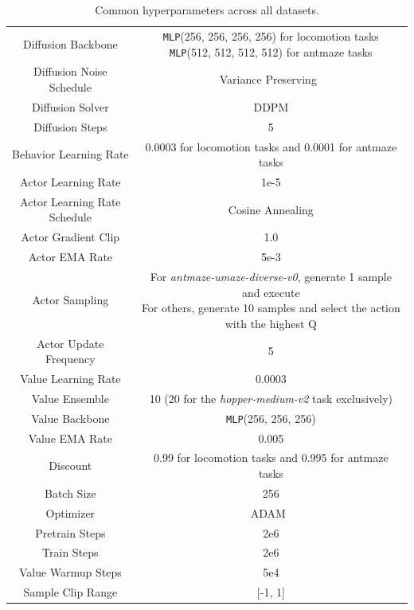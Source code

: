\begin{table}[htbp]
    \centering
    \caption{Common hyperparameters across all datasets.}
    \label{apptab:common_param}
    \begin{tabular}{c|c}
        \toprule
        Diffusion Backbone & \makecell[c]{\texttt{MLP}(256, 256, 256, 256) for locomotion tasks\\\texttt{MLP}(512, 512, 512, 512) for antmaze tasks}\\
        Diffusion Noise Schedule & Variance Preserving~\citep{diffusion_sde}\\
        Diffusion Solver & DDPM \\
        Diffusion Steps & 5\\
        Behavior Learning Rate & 0.0003 for locomotion tasks and 0.0001 for antmaze tasks\\
        Actor Learning Rate & 1e-5\\
        Actor Learning Rate Schedule & Cosine Annealing\\
        Actor Gradient Clip & 1.0\\
        Actor EMA Rate & 5e-3 \\
        Actor Sampling & \makecell[c]{For \textit{antmaze-umaze-diverse-v0}, generate 1 sample and execute\\For others, generate 10 samples and select the action with the highest Q} \\
        Actor Update Frequency & 5\\
        Value Learning Rate & 0.0003 \\
        Value Ensemble & 10  (20 for the \textit{hopper-medium-v2} task exclusively) \\
        Value Backbone & \texttt{MLP}(256, 256, 256)\\
        Value EMA Rate & 0.005 \\
        Discount & 0.99 for locomotion tasks and 0.995 for antmaze tasks\\
        Batch Size & 256 \\
        Optimizer & ADAM~\citep{adam} \\
        Pretrain Steps & 2e6\\
        Train Steps & 2e6\\
        Value Warmup Steps & 5e4\\
        Sample Clip Range & [-1, 1]\\
        \bottomrule
    \end{tabular}
\end{table}


